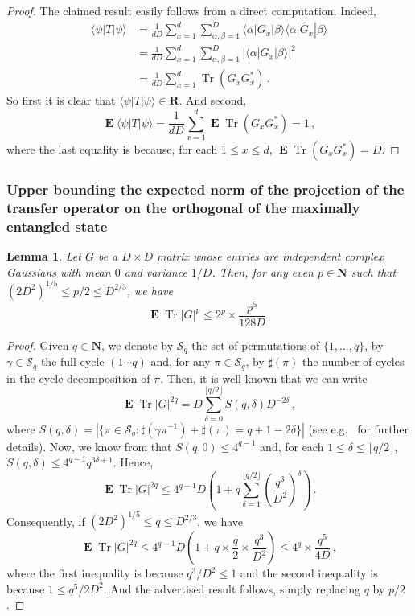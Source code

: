 \documentclass{amsart}
\newtheorem{lemma}[theorem]{Lemma}
\newcommand{\N}{\mathbf{N}}
\newcommand{\R}{\mathbf{R}}
\renewcommand{\leq}{\leqslant}
\DeclareMathOperator{\Tr}{Tr}
\DeclareMathOperator{\E}{\mathbf{E}}
\newcommand{\bra}[1]{\langle #1 |}
\newcommand{\ket}[1]{| #1 \rangle}
\begin{document}
\begin{proof}
    The claimed result easily follows from a direct computation. Indeed,
    \begin{align*}
        \bra{\psi}T\ket{\psi} & = \frac{1}{dD} \sum_{x=1}^d \sum_{\alpha,\beta=1}^{D} \bra{\alpha}G_x\ket{\beta} \bra{\alpha}\bar{G}_x\ket{\beta} \\
                              & = \frac{1}{dD} \sum_{x=1}^d \sum_{\alpha,\beta=1}^{D} |\bra{\alpha}G_x\ket{\beta}|^2                              \\
                              & = \frac{1}{dD} \sum_{x=1}^d \Tr(G_xG_x^*) \, .
    \end{align*}
    So first it is clear that $\bra{\psi}T\ket{\psi}\in\R$. And second,
    \[ \E \bra{\psi}T\ket{\psi} = \frac{1}{dD} \sum_{x=1}^d \E \Tr(G_xG_x^*) = 1 \, , \]
    where the last equality is because, for each $1\leq x\leq d$, $\E \Tr(G_xG_x^*)=D$.
\end{proof}


\subsubsection{Upper bounding the expected norm of the projection of the transfer operator on the orthogonal of the maximally entangled state} \hfill\par\smallskip

\begin{lemma} \label{lem:moments-G}
    Let $G$ be a $D\times D$ matrix whose entries are independent complex Gaussians with mean $0$ and variance $1/D$. Then, for any even $p\in\N$ such that $(2D^2)^{1/5}\leq p/2\leq D^{2/3}$, we have
    \[ \E\Tr|G|^p \leq 2^p\times\frac{p^5}{128D} \, . \]
\end{lemma}

\begin{proof}
    Given $q\in\N$, we denote by $\mathcal{S}_q$ the set of permutations of $\{1,\ldots,q\}$, by $\gamma\in\mathcal{S}_q$ the full cycle $(1\cdots q)$ and, for any $\pi\in\mathcal{S}_q$, by $\sharp(\pi)$ the number of cycles in the cycle decomposition of $\pi$. Then, it is well-known that we can write
    \[ \E\Tr|G|^{2q} = D\sum_{\delta=0}^{\lfloor q/2 \rfloor} S(q,\delta)D^{-2\delta} \, , \]
    where $S(q,\delta)=|\{ \pi\in\mathcal{S}_q : \sharp(\gamma\pi^{-1})+\sharp(\pi)=q+1-2\delta \}|$ (see e.g.~\cite[Appendix B.2]{Lan} for further details). Now, we know from \cite[Lemma 12]{Mon} that $S(q,0)\leq 4^{q-1}$ and, for each $1\leq \delta\leq \lfloor q/2 \rfloor$, $S(q,\delta)\leq 4^{q-1}q^{3\delta+1}$. Hence,
    \[ \E\Tr|G|^{2q} \leq 4^{q-1}D\left(1+q\sum_{\delta=1}^{\lfloor q/2 \rfloor} \left(\frac{q^3}{D^2}\right)^{\delta}\right) \, . \]
    Consequently, if $(2D^2)^{1/5}\leq q\leq D^{2/3}$, we have
    \[ \E\Tr|G|^{2q} \leq 4^{q-1}D\left(1+q\times\frac{q}{2}\times\frac{q^3}{D^2}\right) \leq 4^q\times\frac{q^5}{4D} \, , \]
    where the first inequality is because $q^3/D^2\leq 1$ and the second inequality is because $1\leq q^5/2D^2$. And the advertised result follows, simply replacing $q$ by $p/2$.
\end{proof}
\end{document}
